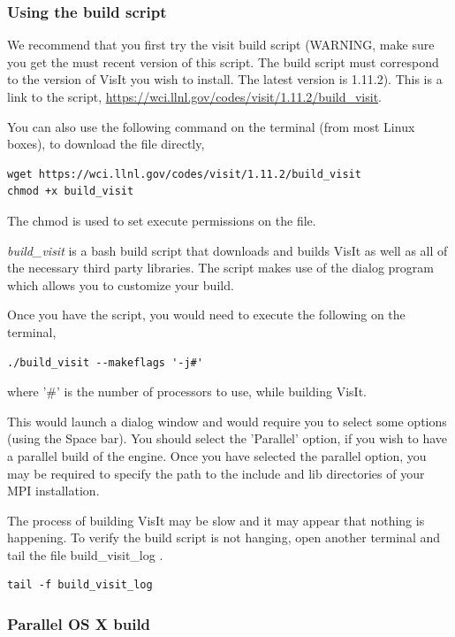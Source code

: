 \documentclass[12pt]{article}
\begin{document}
\subsubsection{Using the build script}
\label{subsec:UsingTheBuildScript}

We recommend that you first try the visit build script (WARNING, make
sure you get the must recent version of this script. The build script
must correspond to the version of VisIt you wish to install. The
latest version is 1.11.2). This is a link to the script,
\url{https://wci.llnl.gov/codes/visit/1.11.2/build\_visit}.

You can also use the following command on the terminal (from most
Linux boxes), to download the file directly,

\begin{verbatim}
wget https://wci.llnl.gov/codes/visit/1.11.2/build_visit
chmod +x build_visit
\end{verbatim}
The chmod is used to set execute permissions on the file.

\emph{build\_visit} is a bash build script that downloads and builds VisIt as
well as all of the necessary third party libraries. The script makes
use of the dialog program which allows you to customize your build.

Once you have the script, you would need to execute the following on
the terminal,

\begin{verbatim}
./build_visit --makeflags '-j#'
\end{verbatim}
where '\#' is the number of processors to use, while building VisIt.

This would launch a dialog window and would require you to select some
options (using the Space bar). You should select the 'Parallel'
option, if you wish to have a parallel build of the engine. Once you
have selected the parallel option, you may be required to specify the
path to the include and lib directories of your MPI installation.

The process of building VisIt may be slow and it may appear that
nothing is happening. To verify the build script is not hanging, open
another terminal and tail the file build\_visit\_log .

\begin{verbatim}
tail -f build_visit_log
\end{verbatim}

\normalfont  
\subsubsection{Parallel OS X build}
\label{sec:ParallelOSXBuild}
\end{document}
